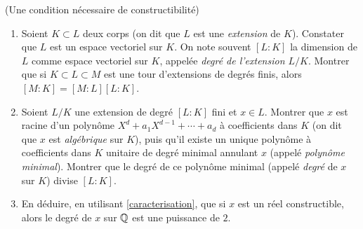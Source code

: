 \documentclass[a4paper,11pt,reqno]{amsart}
\begin{document}
\begin{exo}  (Une condition nécessaire de constructibilité)
  \begin{enumerate}
    \item Soient $K \subset L$ deux corps (on dit que $L$ est une \emph{extension} de $K$). Constater que $L$ est un espace vectoriel sur $K$. On note souvent $[L:K]$ la dimension de $L$ comme espace vectoriel sur $K$, appelée \emph{degré de l'extension $L/K$}. Montrer que si $K \subset L \subset M$ est une tour d'extensions de degrés finis, alors $[M:K]=[M:L][L:K]$.
    \item Soient $L/K$ une extension de degré $[L:K]$ fini et $x \in L$. Montrer que $x$ est racine d'un polynôme $X^d+a_1 X^{d-1} + \cdots + a_d$ à coefficients dans $K$ (on dit que $x$ est \emph{algébrique} sur $K$), puis qu'il existe un unique polynôme à coefficients dans $K$ unitaire de degré minimal annulant $x$ (appelé \textit{polynôme minimal}). Montrer que le degré de ce polynôme minimal (appelé \emph{degré} de $x$ sur $K$) divise $[L:K]$.
    \item En déduire, en utilisant \ref{caracterisation}, que si $x$ est un réel constructible, alors le degré de $x$ sur $\mathbb{Q}$ est une puissance de $2$.
  \end{enumerate}
\end{exo}
\end{document}
